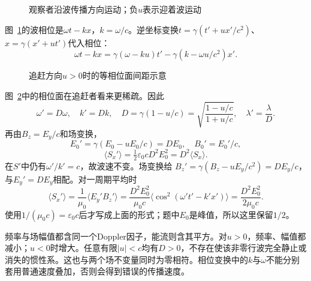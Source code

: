 \begin{figure}[H]\centering
{}
\caption{观察者沿波传播方向运动；负$u$表示迎着波运动}\label{fig:i4-e13-q}
\end{figure}
\begin{solution}
图~\ref{fig:i4-e13-q}的波相位是$\omega t-kx$，$k=\omega/c$。逆坐标变换$t=\gamma(t'+ux'/c^2)$、$x=\gamma(x'+ut')$代入相位：
\[
\omega t-kx=\gamma(\omega-ku)t'
-\gamma(k-\omega u/c^2)x'.
\]

\begin{figure}[H]\centering
{}
\caption{追赶方向$u>0$时的等相位面间距示意}\label{fig:i4-e13-s}
\end{figure}

图~\ref{fig:i4-e13-s}中的相位面在追赶者看来更稀疏。因此
\[
\omega'=D\omega,\quad k'=Dk,\quad
D=\gamma(1-u/c)=\sqrt{\frac{1-u/c}{1+u/c}},
\quad \lambda'=\frac{\lambda}{D}.
\]
再由$B_z=E_y/c$和场变换，
\[
E_0'=\gamma(E_0-uE_0/c)=DE_0,\quad B_0'=E_0'/c,
\]
\[
\boxed{\langle S_x'\rangle
=\tfrac12\varepsilon_0cD^2E_0^2=D^2\langle S_x\rangle}.
\]
在$S'$中仍有$\omega'/k'=c$，故波速不变。场变换给
$B_z'=\gamma(B_z-uE_y/c^2)=DE_y/c$，与$E_y'=DE_y$相配。对一周期平均时
\[
\langle S_x'\rangle
=\frac1{\mu_0}\langle E_y'B_z'\rangle
=\frac{D^2E_0^2}{\mu_0c}\langle\cos^2(\omega't'-k'x')\rangle
=\frac{D^2E_0^2}{2\mu_0c}.
\]
使用$1/(\mu_0c)=\varepsilon_0c$后才写成上面的形式；题中$E_0$是峰值，所以这里保留$1/2$。

频率与场幅值都含同一个Doppler因子，能流则含其平方。对$u>0$，频率、幅值都减小；$u<0$时增大。任意有限$|u|<c$均有$D>0$，不存在使该非零行波完全静止或消失的惯性系。这也与两个场不变量同时为零相符。相位变换中的$k$与$\omega$不能分别套用普通速度叠加，否则会得到错误的传播速度。
\end{solution}

